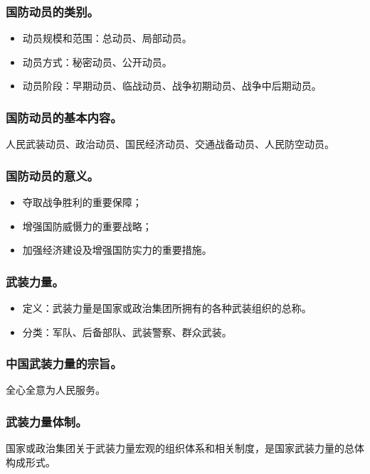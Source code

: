 \documentclass{article}
\begin{document}
\subsubsection{国防动员的类别。}
\begin{itemize}
    \item 动员规模和范围：总动员、局部动员。
    \item 动员方式：秘密动员、公开动员。
    \item 动员阶段：早期动员、临战动员、战争初期动员、战争中后期动员。
\end{itemize}

\subsubsection{国防动员的基本内容。}
人民武装动员、政治动员、国民经济动员、交通战备动员、人民防空动员。

\subsubsection{国防动员的意义。}
\begin{itemize}
    \item 夺取战争胜利的重要保障；
    \item 增强国防威慑力的重要战略；
    \item 加强经济建设及增强国防实力的重要措施。
\end{itemize}

\subsubsection{武装力量。}
\begin{itemize}
    \item 定义：武装力量是国家或政治集团所拥有的各种武装组织的总称。
    \item 分类：军队、后备部队、武装警察、群众武装。
\end{itemize}

\subsubsection{中国武装力量的宗旨。}
全心全意为人民服务。

\subsubsection{武装力量体制。}
国家或政治集团关于武装力量宏观的组织体系和相关制度，是国家武装力量的总体构成形式。
\end{document}
